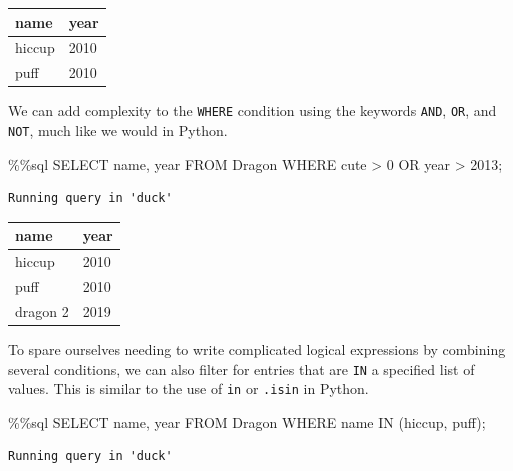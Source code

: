 \documentclass[
  letterpaper,
  DIV=11,
  numbers=noendperiod]{scrreprt}
\newenvironment{Shaded}{\begin{snugshade}}{\end{snugshade}}
\newcommand{\DecValTok}[1]{\textcolor[rgb]{0.68,0.00,0.00}{#1}}
\newcommand{\NormalTok}[1]{\textcolor[rgb]{0.00,0.23,0.31}{#1}}
\newcommand{\OperatorTok}[1]{\textcolor[rgb]{0.37,0.37,0.37}{#1}}
\newcommand{\StringTok}[1]{\textcolor[rgb]{0.13,0.47,0.30}{#1}}
\begin{document}
\begin{longtable}[]{@{}ll@{}}
\toprule\noalign{}
name & year \\
\midrule\noalign{}
\endhead
\bottomrule\noalign{}
\endlastfoot
hiccup & 2010 \\
puff & 2010 \\
\end{longtable}

We can add complexity to the \texttt{WHERE} condition using the keywords
\texttt{AND}, \texttt{OR}, and \texttt{NOT}, much like we would in
Python.

\begin{Shaded}
\begin{Highlighting}[]
\OperatorTok{\%\%}\NormalTok{sql}
\NormalTok{SELECT name, year}
\NormalTok{FROM Dragon}
\NormalTok{WHERE cute }\OperatorTok{\textgreater{}} \DecValTok{0}\NormalTok{ OR year }\OperatorTok{\textgreater{}} \DecValTok{2013}\OperatorTok{;}
\end{Highlighting}
\end{Shaded}

\begin{verbatim}
Running query in 'duck'
\end{verbatim}

\begin{longtable}[]{@{}ll@{}}
\toprule\noalign{}
name & year \\
\midrule\noalign{}
\endhead
\bottomrule\noalign{}
\endlastfoot
hiccup & 2010 \\
puff & 2010 \\
dragon 2 & 2019 \\
\end{longtable}

To spare ourselves needing to write complicated logical expressions by
combining several conditions, we can also filter for entries that are
\texttt{IN} a specified list of values. This is similar to the use of
\texttt{in} or \texttt{.isin} in Python.

\begin{Shaded}
\begin{Highlighting}[]
\OperatorTok{\%\%}\NormalTok{sql}
\NormalTok{SELECT name, year}
\NormalTok{FROM Dragon}
\NormalTok{WHERE name IN (}\StringTok{\textquotesingle{}hiccup\textquotesingle{}}\NormalTok{, }\StringTok{\textquotesingle{}puff\textquotesingle{}}\NormalTok{)}\OperatorTok{;}
\end{Highlighting}
\end{Shaded}

\begin{verbatim}
Running query in 'duck'
\end{verbatim}
\end{document}
